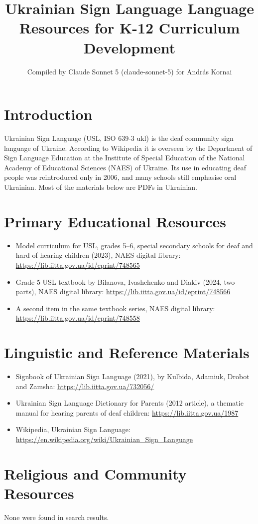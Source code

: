 \documentclass[12pt]{article}
\title{Ukrainian Sign Language Language Resources for K-12 Curriculum Development}
\author{Compiled by Claude Sonnet 5 (claude-sonnet-5) for Andr\'as Kornai}
\date{}
\begin{document}
\maketitle
\section{Introduction}
Ukrainian Sign Language (USL, ISO 639-3 ukl) is the deaf community sign language of Ukraine. According to Wikipedia it is overseen by the Department of Sign Language Education at the Institute of Special Education of the National Academy of Educational Sciences (NAES) of Ukraine. Its use in educating deaf people was reintroduced only in 2006, and many schools still emphasise oral Ukrainian. Most of the materials below are PDFs in Ukrainian.
\section{Primary Educational Resources}
\begin{itemize}
\item Model curriculum for USL, grades 5--6, special secondary schools for deaf and hard-of-hearing children (2023), NAES digital library: \url{https://lib.iitta.gov.ua/id/eprint/748565}
\item Grade 5 USL textbook by Bilanova, Ivashchenko and Diakiv (2024, two parts), NAES digital library: \url{https://lib.iitta.gov.ua/id/eprint/748566}
\item A second item in the same textbook series, NAES digital library: \url{https://lib.iitta.gov.ua/id/eprint/748558}
\end{itemize}
\section{Linguistic and Reference Materials}
\begin{itemize}
\item Signbook of Ukrainian Sign Language (2021), by Kulbida, Adamiuk, Drobot and Zamsha: \url{https://lib.iitta.gov.ua/732056/}
\item Ukrainian Sign Language Dictionary for Parents (2012 article), a thematic manual for hearing parents of deaf children: \url{https://lib.iitta.gov.ua/1987}
\item Wikipedia, Ukrainian Sign Language: \url{https://en.wikipedia.org/wiki/Ukrainian_Sign_Language}
\end{itemize}
\section{Religious and Community Resources}
None were found in search results.
\end{document}
